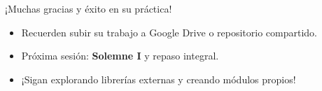\documentclass[10pt]{beamer}
\begin{document}
\begin{frame}
  \huge{\centerline{¡Muchas gracias y éxito en su práctica!}}
  \vspace{0.4cm}
  \normalsize
  \begin{itemize}
    \item Recuerden subir su trabajo a Google Drive o repositorio compartido.
    \item Próxima sesión: \textbf{Solemne I} y repaso integral.
    \item ¡Sigan explorando librerías externas y creando módulos propios!
  \end{itemize}
\end{frame}
\end{document}
